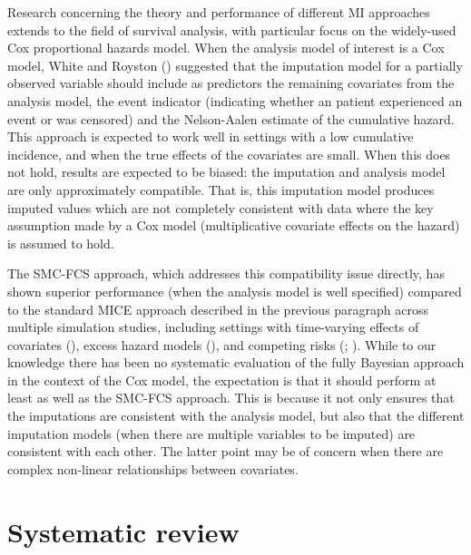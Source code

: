 \documentclass[
  letterpaper,
  paper=240mm:170mm,
  twoside=true,
  open=right,
  fontsize=10pt,
  pagesize=false,
  BCOR=15mm,
  DIV=14,
  headinclude=true,
  footinclude=false,
  headsepline=on]{scrbook}
\begin{document}
Research concerning the theory and performance of different MI
approaches extends to the field of survival analysis, with particular
focus on the widely-used Cox proportional hazards model. When the
analysis model of interest is a Cox model, White and Royston
() suggested that the imputation model for a partially observed
variable should include as predictors the remaining covariates from the
analysis model, the event indicator (indicating whether an patient
experienced an event or was censored) and the Nelson-Aalen estimate of
the cumulative hazard. This approach is expected to work well in
settings with a low cumulative incidence, and when the true effects of
the covariates are small. When this does not hold, results are expected
to be biased: the imputation and analysis model are only approximately
compatible. That is, this imputation model produces imputed values which
are not completely consistent with data where the key assumption made by
a Cox model (multiplicative covariate effects on the hazard) is assumed
to hold.

The SMC-FCS approach, which addresses this compatibility issue directly,
has shown superior performance (when the analysis model is well
specified) compared to the standard MICE approach described in the
previous paragraph across multiple simulation studies, including
settings with time-varying effects of covariates
(),
excess hazard models
(), and competing risks
(;
). While to our knowledge there has been no
systematic evaluation of the fully Bayesian approach in the context of
the Cox model, the expectation is that it should perform at least as
well as the SMC-FCS approach. This is because it not only ensures that
the imputations are consistent with the analysis model, but also that
the different imputation models (when there are multiple variables to be
imputed) are consistent with each other. The latter point may be of
concern when there are complex non-linear relationships between
covariates.

\section{Systematic review}\label{systematic-review}
\end{document}
